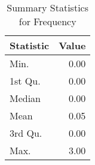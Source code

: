 \begin{table}[ht]
\centering
\begin{tabular}{lr}
  \hline
Statistic & Value \\ 
  \hline
Min. & 0.00 \\ 
  1st Qu. & 0.00 \\ 
  Median & 0.00 \\ 
  Mean & 0.05 \\ 
  3rd Qu. & 0.00 \\ 
  Max. & 3.00 \\ 
   \hline
\end{tabular}
\caption{Summary Statistics for Frequency} 
\label{tab:freq_summary}
\end{table}
